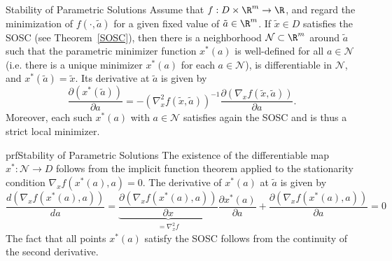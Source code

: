 \begin{theo}{Stability of Parametric Solutions}
    Assume that $f: D \times \R^m \to \R$, and regard the minimization of $f(\cdot,\tilde{a})$ for a given fixed value of $\tilde{a} \in \R^m$. If $\tilde{x} \in D$ satisfies the SOSC (see Theorem~\ref{SOSC}), then there is a neighborhood $\mathcal{N} \subset \R^m$ around $\tilde{a}$ such that the parametric minimizer function $x^*(a)$ is well-defined for all $a \in \mathcal{N}$ (i\@.e\@. there is a unique minimizer $x^*(a)$ for each $a \in \mathcal{N}$), is differentiable in $\mathcal{N}$, and $x^*(\tilde{a}) = \tilde{x}$. Its derivative at $\tilde{a}$ is given by
    \begin{equation*}
        \frac{\partial(x^*(\tilde{a}))}{\partial a} = -{\left(\nabla^2_x f(\tilde{x}, \tilde{a})\right)}^{-1} \frac{\partial \left(\nabla_x f(\tilde{x}, \tilde{a})\right)}{\partial a}. 
    \end{equation*}
    Moreover, each such $x^*(a)$ with $a \in \mathcal{N}$ satisfies again the SOSC and is thus a strict local minimizer.
\end{theo}

\begin{prf}{prfStability of Parametric Solutions}
    The existence of the differentiable map $x^*: \mathcal{N} \rightarrow D$ follows from the implicit function theorem applied to the stationarity condition $\nabla_x f(x^*(a), a) = 0$. The derivative of $x^*(a)$ at $\tilde{a}$ is given by
    \begin{equation*}
        \frac{d(\nabla_x f(x^*(a),a))}{da} = \underbrace{\frac{\partial \left(\nabla_x f(x^*(a), a)\right)}{\partial x}}_{= \nabla^2_x f} \frac{\partial x^*(a)}{\partial a} + \frac{\partial \left(\nabla_x f(x^*(a), a)\right)}{\partial a} = 0
    \end{equation*}
    The fact that all points $x^*(a)$ satisfy the SOSC follows from the continuity of the second derivative.
\end{prf}